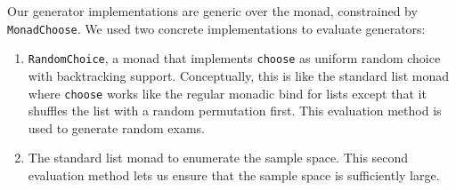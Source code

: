 Our generator implementations are generic over the monad, constrained by \texttt{MonadChoose}.
We used two concrete implementations to evaluate generators:
\begin{enumerate}
    \item
        \texttt{RandomChoice}, a monad that implements \texttt{choose}
        as uniform random choice with backtracking support.
        Conceptually, this is like the standard list monad
        where \texttt{choose} works like the regular monadic bind for lists
        except that it shuffles the list with a random permutation first.
        This evaluation method is used to generate random exams.
    \item
        The standard list monad to enumerate the sample space.
        This second evaluation method lets us ensure that the sample space is sufficiently large.
\end{enumerate}
